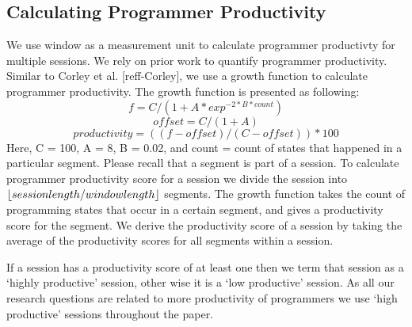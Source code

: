 \subsection{Calculating Programmer Productivity}
\label{productivity}
We use window as a measurement unit to calculate programmer productivty 
for multiple sessions.  
We rely on prior work to quantify programmer productivity. Similar to Corley et al. [reff-Corley], we use a growth function to calculate 
programmer productivity. The growth function is presented as following: 
\begin{equation}
f = C / (1 + A * exp^{ -2 * B * count} )
\end{equation}
\begin{equation}
offset = C / (1+A)
\end{equation}
\begin{equation}
productivity = (( f - offset ) / (C - offset ) ) * 100
\end{equation}
Here, C = 100, A = 8, B = 0.02, and count = count of states that happened in
a particular segment. Please recall that a segment is part of a session. 
To calculate programmer productivity score for a session we divide the session into $\lfloor session length/window length\rfloor$ segments. The growth function takes the count of programming states that occur in a certain segment, and gives a productivity score for the segment. We derive the productivity score of a session by taking the average of the productivity scores for all segments within a session. 

If a session has a productivity score of at least one then we term that session as a `highly productive' session, other wise it is a `low productive' session. As all our research questions are related to 
more productivity of programmers we use `high productive' sessions throughout the paper. 


